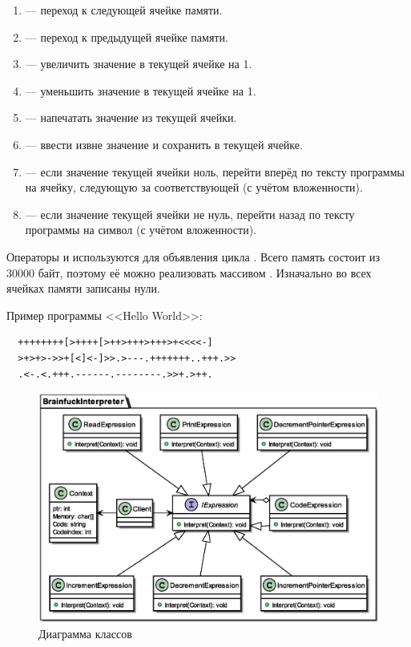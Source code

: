 \documentclass[PI,LAB]{HSEUniversity}
\begin{document}
\begin{enumerate}
  \item \code{>} --- переход к следующей ячейке памяти.
  \item \code{<} --- переход к предыдущей ячейке памяти.
  \item \code{+} --- увеличить значение в текущей ячейке на 1.
  \item \code{-} --- уменьшить значение в текущей ячейке на 1.
  \item {} --- напечатать значение из текущей ячейки.
  \item \code{,} --- ввести извне значение и сохранить в текущей ячейке.
  \item \code{[} --- если значение текущей ячейки ноль, перейти вперёд по тексту программы на ячейку, следующую за соответствующей \code{]} (с учётом вложенности).
  \item \code{]} --- если значение текущей ячейки не нуль, перейти назад по тексту программы на символ \code{[} (с учётом вложенности).
\end{enumerate}

Операторы \code{[} и \code{]} используются для объявления цикла .
Всего память состоит из 30000 байт, поэтому её можно реализовать массивом .
Изначально во всех ячейках памяти записаны нули.

Пример программы <<Hello World>>:
\begin{verbatim}
  ++++++++[>++++[>++>+++>+++>+<<<<-]
  >+>+>->>+[<]<-]>>.>---.+++++++..+++.>>
  .<-.<.+++.------.--------.>>+.>++.
\end{verbatim}

\clearpage

 \begin{figure}[h]
   \centering
   \includegraphics[scale=0.75]{Task_CD.eps}
   \caption{Диаграмма классов}
   \label{fig:Task_CD}
 \end{figure}
\end{document}
